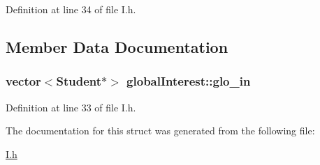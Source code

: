 \-Definition at line 34 of file \-I.\-h.



\subsection{\-Member \-Data \-Documentation}
\hypertarget{structglobalInterest_a4e2fbcca89f8a0dcb6938125ea448edf}{
\subsubsection[{glo\-\_\-in}]{\setlength{\rightskip}{0pt plus 5cm}vector$<${\bf \-Student}$\ast$$>$ {\bf global\-Interest\-::glo\-\_\-in}}}\label{structglobalInterest_a4e2fbcca89f8a0dcb6938125ea448edf}


\-Definition at line 33 of file \-I.\-h.



\-The documentation for this struct was generated from the following file\-:\begin{DoxyCompactItemize}
\item 
\hyperlink{I_8h}{\-I.\-h}\end{DoxyCompactItemize}

